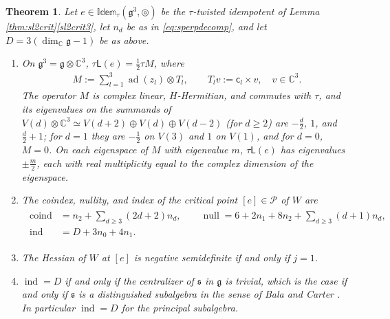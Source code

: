 \documentclass [leqno, 10pt]{amsart}
\newtheorem{theorem}{Theorem}[section]
\theoremstyle{definition}
\numberwithin{equation}{section}
\newcommand{\idem}{\mathbb{Idem}}
\newcommand{\tmlt}{\circledcirc}
\newcommand{\lin}{\mathsf{L}}
\newcommand{\g}{\mathfrak{g}}
\newcommand{\ad}{\operatorname{ad}}
\newcommand{\com}{\mathbb C}
\newcommand{\subs}{\mathfrak{s}}
\begin{document}
\begin{theorem}\label{thm:morse}
Let $e \in \idem_{\tau}(\g^{3}, \tmlt)$ be the $\tau$-twisted idempotent of Lemma \ref{thm:sl2crit}\ref{sl2crit3}, let $n_{d}$ be as in \eqref{eq:sperpdecomp}, and let $D = 3(\dim_{\com}\g - 1)$ be as above.
\begin{enumerate}[label=(\arabic*), ref=(\arabic*)]
\item\label{morse1} On $\g^{3} = \g \otimes \com^{3}$, $\tau\lin(e) = \tfrac{1}{2}\tau M$, where
\begin{align}\label{eq:spinorbit}
M := \sum_{l=1}^{3}\ad(z_{l})\otimes T_{l}, \qquad T_{l}v := \mathsf{c}_{l} \times v, \quad v \in \com^{3}.
\end{align}
The operator $M$ is complex linear, $H$-Hermitian, and commutes with $\tau$, and its eigenvalues on the summands of $V(d) \otimes \com^{3} \simeq V(d+2) \oplus V(d) \oplus V(d-2)$ (for $d \geq 2$) are $-\tfrac{d}{2}$, $1$, and $\tfrac{d}{2}+1$; for $d = 1$ they are $-\tfrac{1}{2}$ on $V(3)$ and $1$ on $V(1)$, and for $d = 0$, $M = 0$. On each eigenspace of $M$ with eigenvalue $m$, $\tau\lin(e)$ has eigenvalues $\pm\tfrac{m}{2}$, each with real multiplicity equal to the complex dimension of the eigenspace.
\item\label{morse2} The coindex, nullity, and index of the critical point $[e] \in \mathcal{P}$ of $W$ are
\begin{align}\label{eq:morseindex}
\begin{aligned}
\operatorname{coind} &= n_{2} + \sum_{d \geq 3}(2d+2)n_{d}, \qquad \operatorname{null} = 6 + 2n_{1} + 8n_{2} + \sum_{d \geq 3}(d+1)n_{d},\\
\operatorname{ind} &= D + 3n_{0} + 4n_{1}.
\end{aligned}
\end{align}
\item\label{morse3} The Hessian of $W$ at $[e]$ is negative semidefinite if and only if $j = 1$.
\item\label{morse4} $\operatorname{ind} = D$ if and only if the centralizer of $\subs$ in $\g$ is trivial, which is the case if and only if $\subs$ is a distinguished subalgebra in the sense of Bala and Carter \cite[Section~8.2]{Collingwood-McGovern}. In particular $\operatorname{ind} = D$ for the principal subalgebra.
\end{enumerate}
\end{theorem}
\end{document}
